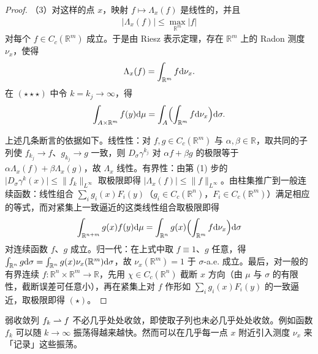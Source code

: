 \documentclass[../../main.tex]{subfiles}%
\begin{document}
\begin{proof}
（3）对这样的点 $x$，映射 $f\mapsto\Lambda_x(f)$ 是线性的，并且
\begin{align*}
\lvert\Lambda_x(f)\rvert\leqslant\max_{\mathbb{R}^m}\lvert f\rvert
\end{align*}
对每个 $f\in C_c(\mathbb{R}^m)$ 成立。于是由 Riesz 表示定理，存在 $\mathbb{R}^m$ 上的 Radon 测度 $\nu_x$，使得
\begin{align*}
\Lambda_x(f)=\int_{\mathbb{R}^m}f\mathrm{d}\nu_x .
\end{align*}
在 $(\star\star\star)$ 中令 $k=k_j\to\infty$，得
\begin{align*}
\int_{A\times\mathbb{R}^m}f(y)\mathrm{d}\mu=\int_A\Bigl(\int_{\mathbb{R}^m}f\mathrm{d}\nu_x\Bigr)\mathrm{d}\sigma .
\end{align*}

上述几条断言的依据如下。线性性：对 $f,g\in C_c(\mathbb{R}^m)$ 与 $\alpha,\beta\in\mathbb{R}$，取共同的子列使 $f_{k_j}\to f$、$g_{k_j}\to g$ 一致，则 $D_\sigma\gamma^{k_j}$ 对 $\alpha f+\beta g$ 的极限等于 $\alpha\Lambda_x(f)+\beta\Lambda_x(g)$，故 $\Lambda_x$ 线性。有界性：由第 (1) 步的 $\lvert D_\sigma\gamma^{k}(x)\rvert\leqslant\lVert f_k\rVert_{L^\infty}$ 取极限即得 $\lvert\Lambda_x(f)\rvert\leqslant\lVert f\rVert_{L^\infty}$。由柱集推广到一般连续函数：线性组合 $\sum_ig_i(x)F_i(y)$（$g_i\in C_c(\mathbb{R}^n)$，$F_i\in C_c(\mathbb{R}^m)$）满足相应的等式，而对紧集上一致逼近的这类线性组合取极限即得
\begin{align*}
\int_{\mathbb{R}^{n+m}}g(x)f(y)\mathrm{d}\mu=\int_{\mathbb{R}^n}g(x)\Bigl(\int_{\mathbb{R}^m}f\mathrm{d}\nu_x\Bigr)\mathrm{d}\sigma
\end{align*}
对连续函数 $f$、$g$ 成立。归一代：在上式中取 $f\equiv1$、$g$ 任意，得 $\int_{\mathbb{R}^n}g\mathrm{d}\sigma=\int_{\mathbb{R}^n}g(x)\nu_x(\mathbb{R}^m)\mathrm{d}\sigma$，故 $\nu_x(\mathbb{R}^m)=1$ 于 $\sigma$-a.e. 成立。最后，对一般的有界连续 $f:\mathbb{R}^n\times\mathbb{R}^m\to\mathbb{R}$，先用 $\chi\in C_c(\mathbb{R}^n)$ 截断 $x$ 方向（由 $\mu$ 与 $\sigma$ 的有限性，截断误差可任意小），再在紧集上对 $f$ 作形如 $\sum_ig_i(x)F_i(y)$ 的一致逼近，取极限即得 $(\star)$。
\end{proof}

弱收敛列 $f_k\rightharpoonup f$ 不必几乎处处收敛，即使取子列也未必几乎处处收敛。例如函数 $f_k$ 可以随 $k\to\infty$ 振荡得越来越快。然而可以在几乎每一点 $x$ 附近引入测度 $\nu_x$ 来「记录」这些振荡。
\end{document}
